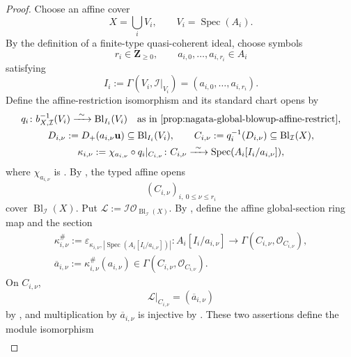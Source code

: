 \begin{proof}
  Choose an affine cover
  \[
    X=\bigcup_iV_i,\qquad V_i=\operatorname{Spec}(A_i).
  \]
  By the definition of a finite-type quasi-coherent ideal, choose symbols
  \[
    r_i\in\mathbf Z_{\ge0},\qquad
    a_{i,0},\ldots,a_{i,r_i}\in A_i
  \]
  satisfying
  \[
    I_i:=\Gamma(V_i,\mathcal I|_{V_i})
      =(a_{i,0},\ldots,a_{i,r_i}).
  \]
  Define the affine-restriction isomorphism and its standard chart opens by
  \[
  \begin{gathered}
    q_i\colon b_{X,\mathcal I}^{-1}(V_i)
      \xrightarrow{\ \sim\ }\operatorname{Bl}_{I_i}(V_i)
      \quad\text{as in \Cref{prop:nagata-global-blowup-affine-restrict}},\\
    D_{i,\nu}:=D_+(a_{i,\nu}\mathbf u)
      \subseteq\operatorname{Bl}_{I_i}(V_i),\qquad
    C_{i,\nu}:=q_i^{-1}(D_{i,\nu})
      \subseteq\operatorname{Bl}_{\mathcal I}(X),\\
    \kappa_{i,\nu}:=
      \chi_{a_{i,\nu}}\circ q_i|_{C_{i,\nu}}\colon
      C_{i,\nu}\xrightarrow{\ \sim\ }
      \operatorname{Spec}(A_i[I_i/a_{i,\nu}]),
  \end{gathered}
  \]
  where $\chi_{a_{i,\nu}}$ is
  .  By
  , the typed affine opens
  \[
    (C_{i,\nu})_{i,\ 0\leq\nu\leq r_i}
  \]
  cover $\operatorname{Bl}_{\mathcal I}(X)$.  Put
  $\mathcal L:=\mathcal I\mathcal O_{\operatorname{Bl}_{\mathcal I}(X)}$.
  By , define the affine
  global-section ring map and the section
  \[
  \begin{gathered}
    \kappa_{i,\nu}^{\#}
      :=\varepsilon_{\kappa_{i,\nu},
        |\operatorname{Spec}(A_i[I_i/a_{i,\nu}])|}\colon
      A_i[I_i/a_{i,\nu}]\longrightarrow
        \Gamma(C_{i,\nu},\mathcal O_{C_{i,\nu}}),\\
    \overline a_{i,\nu}:=
      \kappa_{i,\nu}^{\#}(a_{i,\nu})
      \in\Gamma(C_{i,\nu},\mathcal O_{C_{i,\nu}}).
  \end{gathered}
  \]
  On $C_{i,\nu}$,
  \[
    \mathcal L|_{C_{i,\nu}}=(\overline a_{i,\nu})
  \]
  by , and multiplication
  by $\overline a_{i,\nu}$ is injective by
  .  These two assertions define
  the module isomorphism
  \[
  \begin{aligned}

\end{aligned}\]
\end{proof}
